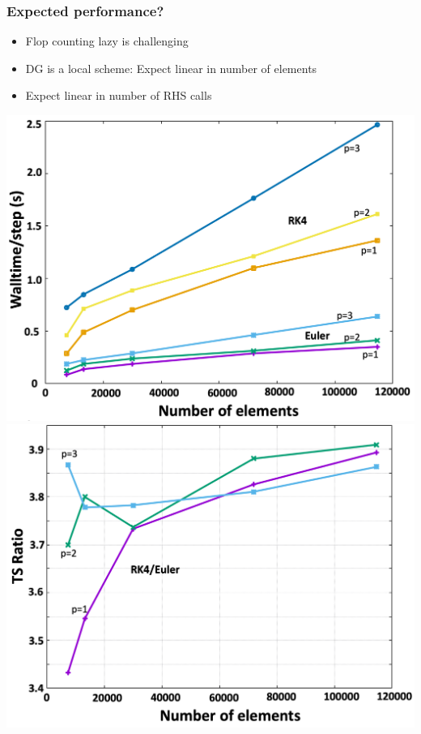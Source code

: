 \begin{frame}\frametitle{Expected performance?}
\begin{itemize}
\item Flop counting lazy is challenging
\item DG is a local scheme: Expect linear in number of elements
\item Expect linear in number of RHS calls
\end{itemize}
\includegraphics[width=.45\textwidth]{figures/TSCompare.png}
\includegraphics[width=.45\textwidth]{figures/TSRatio.png}
\end{frame}

